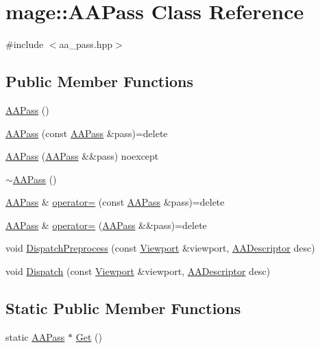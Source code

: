 \hypertarget{classmage_1_1_a_a_pass}{}\section{mage\+:\+:A\+A\+Pass Class Reference}
\label{classmage_1_1_a_a_pass}


{\ttfamily \#include $<$aa\+\_\+pass.\+hpp$>$}

\subsection*{Public Member Functions}
\begin{DoxyCompactItemize}
\item 
\hyperlink{classmage_1_1_a_a_pass_a252ae39e2a24d3c82294aa9f308877b1}{A\+A\+Pass} ()
\item 
\hyperlink{classmage_1_1_a_a_pass_ad04c9e92bfb9f0318a56d980514f9a1a}{A\+A\+Pass} (const \hyperlink{classmage_1_1_a_a_pass}{A\+A\+Pass} \&pass)=delete
\item 
\hyperlink{classmage_1_1_a_a_pass_a43a1a7fe8e5f02a67259b865edb2f34e}{A\+A\+Pass} (\hyperlink{classmage_1_1_a_a_pass}{A\+A\+Pass} \&\&pass) noexcept
\item 
\hyperlink{classmage_1_1_a_a_pass_af7660ffa2372608eb597918026ef1e19}{$\sim$\+A\+A\+Pass} ()
\item 
\hyperlink{classmage_1_1_a_a_pass}{A\+A\+Pass} \& \hyperlink{classmage_1_1_a_a_pass_a7462e2075a48698258c3e0758051b692}{operator=} (const \hyperlink{classmage_1_1_a_a_pass}{A\+A\+Pass} \&pass)=delete
\item 
\hyperlink{classmage_1_1_a_a_pass}{A\+A\+Pass} \& \hyperlink{classmage_1_1_a_a_pass_a965b55e550f0214ae4a7772d064fd46e}{operator=} (\hyperlink{classmage_1_1_a_a_pass}{A\+A\+Pass} \&\&pass)=delete
\item 
void \hyperlink{classmage_1_1_a_a_pass_a519b11a19b347c288a077f5d84090542}{Dispatch\+Preprocess} (const \hyperlink{classmage_1_1_viewport}{Viewport} \&viewport, \hyperlink{namespacemage_a0b400065340fa5cca0ce4c2809d91af1}{A\+A\+Descriptor} desc)
\item 
void \hyperlink{classmage_1_1_a_a_pass_a122e9faba1e318d1eb74924c41e089ab}{Dispatch} (const \hyperlink{classmage_1_1_viewport}{Viewport} \&viewport, \hyperlink{namespacemage_a0b400065340fa5cca0ce4c2809d91af1}{A\+A\+Descriptor} desc)
\end{DoxyCompactItemize}
\subsection*{Static Public Member Functions}
\begin{DoxyCompactItemize}
\item 
static \hyperlink{classmage_1_1_a_a_pass}{A\+A\+Pass} $\ast$ \hyperlink{classmage_1_1_a_a_pass_a45b63b6ea60b3709556da1e00f0ab672}{Get} ()
\end{DoxyCompactItemize}
